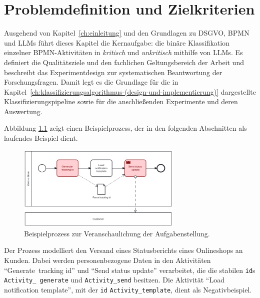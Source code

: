 \chapter{Problemdefinition und Zielkriterien}\label{ch:problemdefinition-und-zielkriterien}

Ausgehend von Kapitel~\ref{ch:einleitung} und den Grundlagen zu \ac{DSGVO}, \ac{BPMN} und \acp{LLM} führt dieses Kapitel die Kernaufgabe: die binäre Klassifikation einzelner \ac{BPMN}-Aktivitäten in \emph{kritisch} und \emph{unkritisch} mithilfe von \acp{LLM}. Es definiert die Qualitätsziele und den fachlichen Geltungsbereich der Arbeit und beschreibt das Experimentdesign zur systematischen Beantwortung der Forschungsfragen. Damit legt es die Grundlage für die in Kapitel~\ref{ch:klassifizierungsalgorithmus-(design-und-implementierung)} dargestellte Klassifizierungspipeline sowie für die anschließenden Experimente und deren Auswertung.

Abbildung \ref{fig:running_example} zeigt einen Beispielprozess, der in den folgenden Abschnitten als laufendes Beispiel dient.

\begin{figure}[h]
    \centering
    \includegraphics[width=0.7\textwidth]{images/running_example_en}
    \caption{Beispielprozess zur Veranschaulichung der Aufgabenstellung.}
    \label{fig:running_example}
\end{figure}

Der Prozess modelliert den Versand eines Statusberichts eines Onlineshops an Kunden. Dabei werden personenbezogene Daten in den Aktivitäten \enquote{Generate\linebreak~tracking id} und \enquote{Send status update} verarbeitet, die die stabilen \texttt{id}s \texttt{Activity\_\linebreak~generate} und \texttt{Activity\_send} besitzen. Die Aktivität \enquote{Load notification template}, mit der \texttt{id} \texttt{Activity\_template}, dient als Negativbeispiel.





